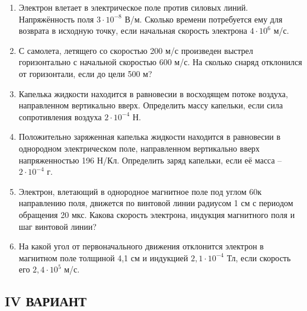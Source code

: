 \documentclass[a6paper, 11pt]{diss_4}
\renewcommand{\'}{\,'}
\begin{document}
\begin{enumerate}

\item Электрон влетает в электрическое поле против силовых линий. Напряжённость поля $3\cdot10^{-8}$ В/м. Сколько времени потребуется ему для возврата в исходную точку, если начальная скорость электрона $4\cdot10^6$ м/с.

\item С самолета, летящего со скоростью 200 м/с произведен выстрел горизонтально с начальной скоростью 600 м/с. На сколько снаряд отклонился от горизонтали, если до цели  500 м?

\item Капелька жидкости находится в равновесии в восходящем потоке воздуха, направленном  вертикально вверх. Определить массу капельки, если сила сопротивления воздуха $2\cdot10^{-4}$ Н.

\item Положительно заряженная капелька жидкости находится в равновесии в однородном электрическом поле, направленном  вертикально вверх напряженностью  196 Н/Кл. Определить заряд капельки, если её масса  -- $2\cdot10^{-4}$ г.

\item Электрон, влетающий в однородное магнитное поле под углом 60\textdegree к направлению поля, движется по винтовой линии радиусом 1 см с периодом обращения 20 мкс. Какова скорость электрона, индукция магнитного поля и шаг винтовой линии?

\item На какой угол от первоначального движения отклонится электрон в магнитном поле толщиной 4,1 см и индукцией $2,1\cdot10^{-4}$ Тл, если скорость его $2,4\cdot10^5$ м/с.

\end{enumerate}

\subsection{IV ВАРИАНТ}
\end{document}
